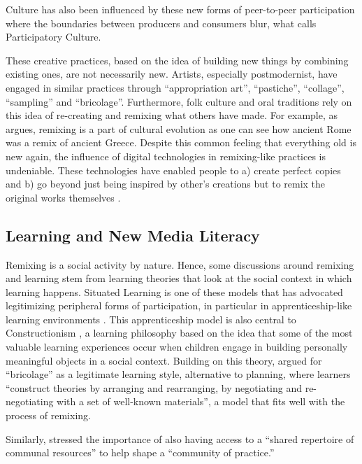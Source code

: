 Culture has also been influenced by these new forms of peer-to-peer participation where the boundaries between producers and consumers blur, what \citet{jenkins_convergence_2006} calls Participatory Culture.

These creative practices, based on the idea of building new things by combining existing ones, are not necessarily new. 
Artists, especially postmodernist, have engaged in similar practices through ``appropriation art'', ``pastiche'', ``collage'', ``sampling'' and ``bricolage''. 
Furthermore, folk culture and oral traditions rely on this idea of re-creating and remixing what others have made. %
For example, as \citet{manovich_remix_2005} argues, remixing is a part of cultural evolution as one can see how ancient Rome was a remix of ancient Greece.
Despite this common feeling that everything old is new again, the influence of digital technologies in remixing-like practices is undeniable. 
These technologies have enabled people to a) create perfect copies and b) go beyond just being inspired by other's creations but to remix the original works themselves \citep{sinnreich_ethics_2009}.

\subsection{Learning and New Media Literacy}

Remixing is a social activity by nature. Hence, some discussions around remixing and learning stem from learning theories that look at the social context in which learning happens.
Situated Learning is one of these models that has advocated legitimizing peripheral forms of participation, in particular in apprenticeship-like learning environments \citep{lave_situated_1991}. 
This apprenticeship model is also central to Constructionism \citep{papert_mindstorms_1980}, a learning philosophy based on the idea that some of the most valuable learning experiences occur when children engage in building personally meaningful objects in a social context. 
Building on this theory, \citet{turkle_epistemological_1990} argued for ``bricolage'' as a legitimate learning style, alternative to planning, where learners ``construct theories by arranging and rearranging, by negotiating and re-negotiating with a set of well-known materials'', a model that fits well with the process of remixing.

Similarly, \citet{wenger_communities_1998} stressed the importance of also having access to a ``shared repertoire of communal resources'' to help shape a ``community of practice.''

